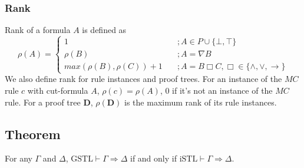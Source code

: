 \subsubsection{Rank} Rank of a formula $A$ is defined as
\[ \rho(A) = \begin{cases}
1 & \quad ; A \in P \cup \{ \bot, \top \} \\
\rho(B) & \quad ; A = \nabla B \\
max(\rho(B), \rho(C)) + 1 & \quad ; A = B \Box C, \Box \in \{ \land , \lor, \rightarrow \}
\end{cases} \]
We also define rank for rule instances and proof trees. For an instance of the $MC$ rule $c$ with cut-formula $A$, $\rho(c) = \rho(A)$, $0$ if it's not an instance of the $MC$ rule.
For a proof tree $\mathbf{D}$, $\rho(\mathbf{D})$ is the maximum rank of its rule instances.

\subsection{Theorem} \label{translation} For any $\Gamma$ and $\Delta$, $\text{GSTL} \vdash \Gamma \Rightarrow \Delta$ if and only if $\text{iSTL} \vdash \Gamma \Rightarrow \Delta$.

